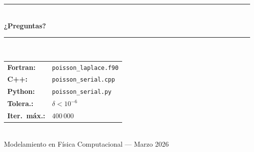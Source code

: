 \documentclass[aspectratio=169, 11pt]{beamer}
\begin{document}
{
\begin{frame}[plain]
  \begin{center}
    \vspace{1.2cm}
    \textcolor{white}{\rule{0.6\linewidth}{0.8pt}}\\[0.6cm]
    {\color{white}\LARGE\textbf{¿Preguntas?}}\\[0.8cm]
    \textcolor{white}{\rule{0.6\linewidth}{0.8pt}}\\[0.8cm]
    \begin{tabular}{ll}
      \color{white}\textbf{Fortran:} & \color{azulmed!80!white}\texttt{poisson\_laplace.f90} \\[0.2cm]
      \color{white}\textbf{C++:}     & \color{azulmed!80!white}\texttt{poisson\_serial.cpp} \\[0.2cm]
      \color{white}\textbf{Python:}  & \color{azulmed!80!white}\texttt{poisson\_serial.py} \\[0.2cm]
      \color{white}\textbf{Tolera.:} & \color{azulmed!80!white}$\delta < 10^{-6}$ \\[0.2cm]
      \color{white}\textbf{Iter.\ máx.:} & \color{azulmed!80!white}$400\,000$ \\
    \end{tabular}\\[0.8cm]
    {\color{azulmed!80!white}\normalsize Modelamiento en Física Computacional — Marzo 2026}
  \end{center}
\end{frame}
}
\end{document}
